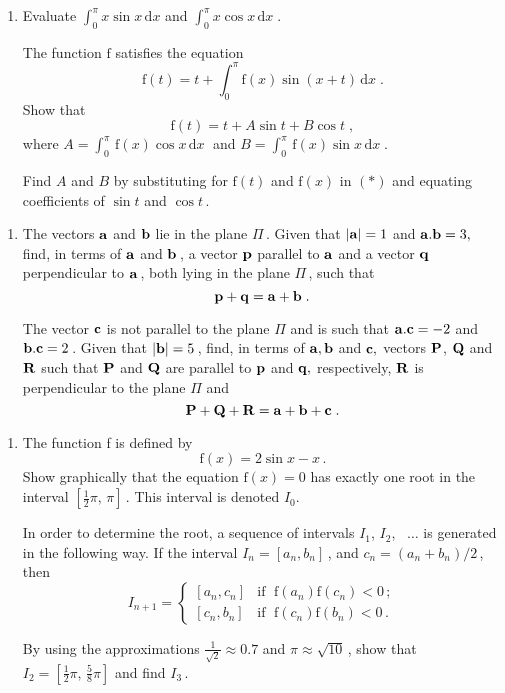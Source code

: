 \documentclass[a4, 11pt]{report}
\newlength{\qspace}
\newcounter{qnumber}
\newenvironment{question}%
 {\vspace{\qspace}
  \begin{enumerate}[\bfseries 1\quad][10]%
    \setcounter{enumi}{\value{qnumber}}%
    \item%
 }
{
  \end{enumerate}
  \filbreak
  \stepcounter{qnumber}
 }
\def\d{{\mathrm d}}
\def\f{{\mathrm f}}
\newcommand{\ds}{\displaystyle}
\def\half{{\textstyle \frac12}}
\begin{document}
\begin{question}
Evaluate  $\int_0^{{\pi}} x \sin x\,\d x$
and $\int_0^{{\pi}} x \cos x\,\d x\;$.

The function $\f$ satisfies the equation
\begin{equation}
\f(t)=t + \int_0^{{\pi}} \f(x)\sin(x+t)\,\d x\;. 
\tag{$*$}
\end{equation}
Show that 
\[
\f(t)=t + A\sin t + B\cos t\;,        
\]
where $A= \int_0^{{\pi}}\,\f(x)\cos x\,\d x\;$ and
      $B= \int_0^{{\pi}}\,\f(x)\sin x\,\d x\;$. 

Find $A$ and $B$ by substituting for $\f(t)$ and $\f(x)$ in $(*)$
and equating coefficients of 
$\sin t$ and $\cos t\,$.
	\end{question}
	
\begin{question}
The vectors ${\bf a}$ and ${\bf b}$ lie in the plane
$\Pi\,$.  Given that $\vert {\bf a} \vert= 1$  and 
${\bf a}.{\bf b} = 3,$ find, in terms of
${\bf a}$ and ${\bf b}\,$, a vector ${\bf p}$ parallel to
${\bf a}$  and a vector ${\bf q}$  perpendicular to ${\bf a}\,$, both 
lying in the plane $\Pi\,$, such that 
$${\bf p}+{\bf q}={\bf a}+{\bf b}\;.$$

The vector ${\bf c}$  is not parallel to the plane $\Pi$ and is such that
${\bf a}.{\bf c} = -2$ and ${\bf b}.{\bf c} = 2\,$. Given  that
$\vert {\bf b} \vert = 5\,$, find, in terms of
${\bf a}, {\bf b}$  and ${\bf c},$ vectors ${\bf P}$, ${\bf Q}$
and ${\bf R}$  such that ${\bf P}$ and ${\bf Q}$ are parallel to
${\bf p}$ and ${\bf q},$  respectively, ${\bf R}$
is perpendicular to the plane $\Pi$  and
$${\bf P} + {\bf Q} + {\bf R} =  {\bf a}+{\bf b}+{\bf c}\;.$$
\end{question}
	
\begin{question}
The function f is defined by
$$\f(x) = 2\sin x - x\,.$$
Show graphically that the equation $\f(x)=0$
has exactly one root in the interval 
$[\half \pi ,\,{\pi}]\,$. This interval is denoted $I_0$.

In order to determine the root, a sequence of
intervals $I_1$, $I_2$, \, $\ldots$ is generated in the following way.
If the interval 
$I_n=[a_n,b_n]\,$, and $c_n=(a_n+b_n)/2\,$, then
\begin{equation*}
I_{n+1}=
\begin{cases}
[a_n,c_n] & \text{if $\; \f(a_n)\f(c_n)<0 \,$}; \\[5pt]
[c_n,b_n] & \text{if $\; \f(c_n)\f(b_n)<0 \,$}.
\end{cases}
\end{equation*}


By using the approximations $\ds \frac 1{\sqrt{2}} \approx 0.7$ and
${\pi} \approx \sqrt{10} \,$,
show that $I_2=[\half{\pi},\,\frac58{\pi}]$ and find $I_3\,$.
\end{question}
		
\end{document}
